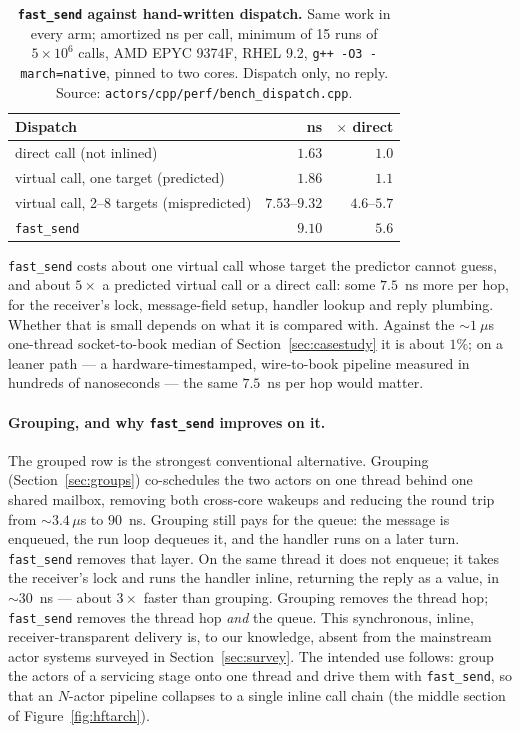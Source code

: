 \documentclass[11pt]{article}
\newcommand{\fs}{\texttt{fast\_send}}
\begin{document}
\begin{table}[!htb]
\centering
\caption{\textbf{\fs{} against hand-written dispatch.} Same work in every arm;
amortized ns per call, minimum of 15 runs of $5\times10^6$ calls, AMD EPYC 9374F,
RHEL 9.2, \texttt{g++ -O3 -march=native}, pinned to two cores. Dispatch only, no
reply. Source: \texttt{actors/cpp/perf/bench\_dispatch.cpp}.}
\label{tab:dispatch}
\small
\begin{tabular}{lrr}
\toprule
Dispatch & ns & $\times$ direct \\
\midrule
direct call (not inlined)                         & $1.63$ & $1.0$ \\
virtual call, one target (predicted)             & $1.86$ & $1.1$ \\
virtual call, 2--8 targets (mispredicted)        & $7.53$--$9.32$ & $4.6$--$5.7$ \\
\fs{}                                            & $9.10$ & $5.6$ \\
\bottomrule
\end{tabular}
\end{table}

\fs{} costs about one virtual call whose target the predictor cannot guess, and
about $5\times$ a predicted virtual call or a direct call: some $7.5$~ns more per
hop, for the receiver's lock, message-field setup, handler lookup and reply
plumbing. Whether that is small depends on what it is compared with. Against the
$\sim\!1~\mu$s one-thread socket-to-book median of Section~\ref{sec:casestudy}
it is about $1\%$; on a leaner path --- a hardware-timestamped, wire-to-book pipeline measured
in hundreds of nanoseconds --- the same $7.5$~ns per hop would matter.

\paragraph{Grouping, and why \fs{} improves on it.} The grouped row is the
strongest conventional alternative. Grouping (Section~\ref{sec:groups})
co-schedules the two actors on one thread behind one shared mailbox, removing
both cross-core wakeups and reducing the round trip from $\sim\!3.4\,\mu$s
to $90$~ns. Grouping still pays for the queue: the message is enqueued, the run
loop dequeues it, and the handler runs on a later turn. \fs{} removes that layer.
On the same thread it does not enqueue; it takes the receiver's lock and runs the
handler inline, returning the reply as a value, in $\sim\!30$~ns --- about
$3\times$ faster than grouping. Grouping removes the thread hop; \fs{} removes the
thread hop \emph{and} the queue. This synchronous, inline, receiver-transparent
delivery is, to our knowledge, absent from the mainstream actor systems surveyed
in Section~\ref{sec:survey}. The intended use follows: group the actors of a
servicing stage onto one thread and drive them with \fs{}, so that an $N$-actor
pipeline collapses to a single inline call chain (the middle section of
Figure~\ref{fig:hftarch}).
\end{document}

